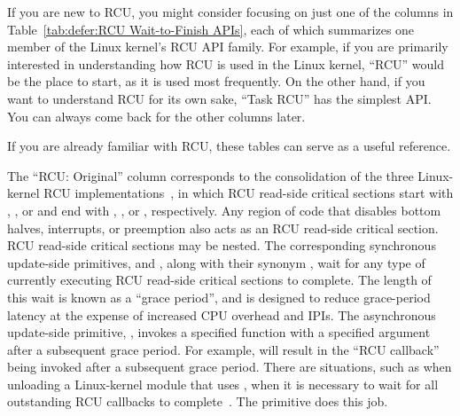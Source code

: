 If you are new to RCU, you might consider focusing on just one
of the columns in
Table~\ref{tab:defer:RCU Wait-to-Finish APIs},
each of which summarizes one member of the Linux kernel's RCU API family.
For example, if you are primarily interested in understanding how RCU
is used in the Linux kernel, ``RCU'' would be the place to start,
as it is used most frequently.
On the other hand, if you want to understand RCU for its own sake,
``Task RCU'' has the simplest API.
You can always come back for the other columns later.

If you are already familiar with RCU, these tables can
serve as a useful reference.

\QuickQuizEnd

The ``RCU: Original'' column corresponds to the consolidation of the
three Linux-kernel RCU
implementations~\cite{PaulEMcKenney2019RCUCVE,McKenney:2019:CRS:3319647.3325836},
in which RCU read-side critical sections start with
, , or 
and end with , ,
or , respectively.
Any region of code that disables bottom halves, interrupts, or preemption
also acts as an RCU read-side critical section.
RCU read-side critical sections may be nested.
The corresponding synchronous update-side primitives,
 and , along with
their synonym , wait for any type of currently
executing RCU read-side critical sections to complete.
The length of this wait is known as a ``grace period'', and
 is designed to reduce grace-period
latency at the expense of increased CPU overhead and IPIs.
The asynchronous update-side primitive, ,
invokes a specified function with a specified argument after a
subsequent grace period.
For example,  will result in
the ``RCU callback'' 
being invoked after a subsequent grace period.
There are situations,
such as when unloading a Linux-kernel module that uses ,
when it is necessary to wait for all
outstanding RCU callbacks to complete~\cite{PaulEMcKenney2007rcubarrier}.
The  primitive does this job.

